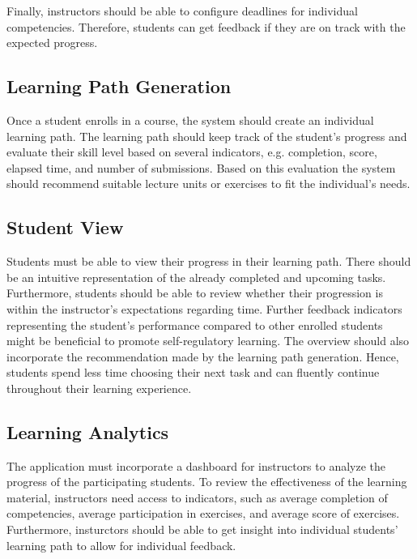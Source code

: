 \documentclass[a4paper,12pt,twoside]{article}
\begin{document}
Finally, instructors should be able to configure deadlines for individual competencies. Therefore, students can get feedback if they are on track with the
expected progress.

\subsection{Learning Path Generation}
Once a student enrolls in a course, the system should create an individual learning path. The learning path should keep track of the student's progress and evaluate
their skill level based on several indicators, e.g. completion, score, elapsed time, and number of submissions. Based on this evaluation the system should
recommend suitable lecture units or exercises to fit the individual's needs.

\subsection{Student View}
Students must be able to view their progress in their learning path. There should be an intuitive representation of the already completed and upcoming tasks.
Furthermore, students should be able to review whether their progression is within the instructor's expectations regarding time. Further feedback indicators
representing the student's performance compared to other enrolled students might be beneficial to promote self-regulatory learning.
The overview should also incorporate the recommendation made by the learning path generation. Hence, students spend less time choosing their next task and can fluently
continue throughout their learning experience.

\subsection{Learning Analytics}
The application must incorporate a dashboard for instructors to analyze the progress of the participating students. To review the effectiveness of the learning material,
instructors need access to indicators, such as average completion of competencies, average participation in exercises, and average score of exercises.
Furthermore, insturctors should be able to get insight into individual students' learning path to allow for individual feedback.
\end{document}
